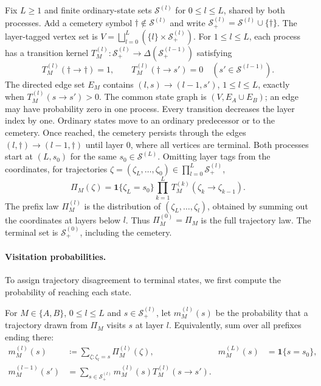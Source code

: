 Fix $L\ge1$ and finite ordinary-state sets $\mathcal S^{(l)}$ for $0\le l\le L$, shared by both processes. Add a cemetery symbol $\dagger\notin\mathcal S^{(l)}$ and write $\mathcal S^{(l)}_+=\mathcal S^{(l)}\cup\{\dagger\}$. The layer-tagged vertex set is $V=\bigsqcup_{l=0}^{L}(\{l\}\times\mathcal S^{(l)}_+)$. For $1\le l\le L$, each process has a transition kernel $T_M^{(l)}:\mathcal S^{(l)}_+\to\Delta(\mathcal S^{(l-1)}_+)$ satisfying
\begin{equation}\label{ptnb:eq:cemetery-absorbing}
 T_M^{(l)}(\dagger\to\dagger)=1,
 \qquad T_M^{(l)}(\dagger\to s')=0\quad(s'\in\mathcal S^{(l-1)}).
\end{equation}
The directed edge set $E_M$ contains $(l,s)\to(l-1,s')$, $1\le l\le L$, exactly when $T_M^{(l)}(s\to s')>0$. The common state graph is $(V,E_A\cup E_B)$; an edge may have probability zero in one process. Every transition decreases the layer index by one. Ordinary states move to an ordinary predecessor or to the cemetery. Once reached, the cemetery persists through the edges $(l,\dagger)\to(l-1,\dagger)$ until layer $0$, where all vertices are terminal. Both processes start at $(L,s_0)$ for the same $s_0\in\mathcal S^{(L)}$. Omitting layer tags from the coordinates, for trajectories $\zeta=(\zeta_L,\ldots,\zeta_0)\in\prod_{l=0}^L\mathcal S^{(l)}_+$,
\begin{equation}\label{ptnb:eq:path-measure}
 \Pi_M(\zeta)=\mathbf1\{\zeta_L=s_0\}\prod_{k=1}^L T_M^{(k)}(\zeta_k\to\zeta_{k-1}).
\end{equation}
The prefix law $\Pi_M^{(l)}$ is the distribution of $(\zeta_L,\ldots,\zeta_l)$, obtained by summing out the coordinates at layers below $l$. Thus $\Pi_M^{(0)}=\Pi_M$ is the full trajectory law. The terminal set is $\mathcal S_+^{(0)}$, including the cemetery.

\paragraph{Visitation probabilities.}\label{ptnb:sec:lmp-marginals}
To assign trajectory disagreement to terminal states, we first compute the probability of reaching each state.
\begin{definition}\label{def:trajectory_marginals}
For $M\in\{A,B\}$, $0\le l\le L$ and $s\in\mathcal S_+^{(l)}$, let $m_M^{(l)}(s)$ be the probability that a trajectory drawn from $\Pi_M$ visits $s$ at layer $l$. Equivalently, sum over all prefixes ending there:
\begin{align}
 m_M^{(l)}(s)&\coloneqq\sum_{\zeta:\zeta_l=s}\Pi_M^{(l)}(\zeta),
 &m_M^{(L)}(s)&=\mathbf1\{s=s_0\},\label{ptnb:eq:lmp-alpha}\\
 m_M^{(l-1)}(s')&=\sum_{s\in\mathcal S^{(l)}_+}m_M^{(l)}(s)T_M^{(l)}(s\to s').\label{ptnb:eq:lmp-alpha-recursion}
\end{align}
\end{definition}

